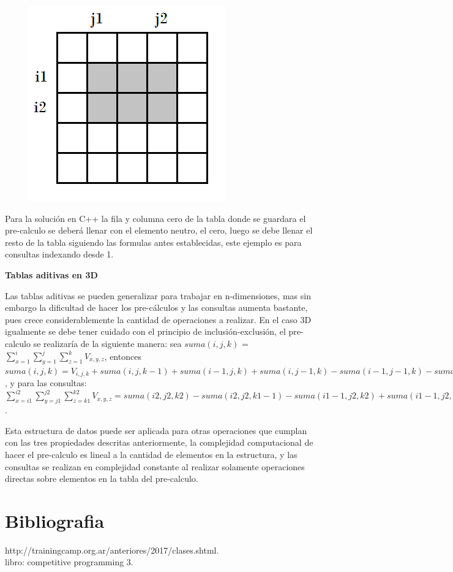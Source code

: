 \documentclass[12pt, a4paper]{article}
\newcommand\cppfile[2][]{

}
\newcommand{\subtitulo}[1]{\begin{center}\textbf{#1}\end{center}}
\begin{document}
\begin{figure}[!htb]
			\caption{}%
		\endminipage
			\centering
			\includegraphics[scale=0.4]{Estructuras_de_datos/imagenes/img4}
			\caption{}
		\endminipage
	\end{figure}
	
	Para la solución en C++ la fila y columna cero de la tabla donde se guardara el pre-calculo se deberá llenar
	con el elemento neutro, el cero, luego se debe llenar el resto de la tabla siguiendo las formulas antes 
	establecidas, este ejemplo es para consultas indexando desde 1.
	\cppfile[26-36]{Estructuras_de_datos/codigos/tablas_aditivas.cpp}
	
	\subtitulo{Tablas aditivas en 3D}
	
	Las tablas aditivas se pueden generalizar para trabajar en n-dimensiones, mas sin embargo la dificultad de hacer 
	los pre-cálculos y las consultas aumenta bastante, pues crece considerablemente la cantidad de operaciones a
	realizar. En el caso 3D igualmente se debe tener cuidado con el principio de inclusión-exclusión, el 
	pre-calculo se realizaría de la siguiente manera: sea 
	$suma(i,j,k)$ = $\sum_{x=1}^{i} \sum_{y=1}^{j} \sum_{z=1}^{k} V_{x,y,z}$, entonces  
	$suma(i,j,k) = V_{i,j,k} + suma(i,j,k-1)+suma(i-1,j,k)+suma(i,j-1,k)-suma(i-1,j-1,k)-suma(i-1,j,k-1)
	-suma(i,j-1,k-1)+suma(i-1,j-1,k-1)$, y para las consultas: $\sum_{x=i1}^{i2} \sum_{y=j1}^{j2} \sum_{z=k1}^{k2}
	V_{x,y,z} = suma(i2,j2,k2)-suma(i2,j2,k1-1)-suma(i1-1,j2,k2)+suma(i1-1,j2,k1-1)-suma(i2,j1-1,k2)
	+suma(i2,j1-1,k1-1)+suma(i1-1,j1-1,k2)-suma(i1-1,j1-1,k1-1)$.
	
	Esta estructura de datos puede ser aplicada para otras operaciones que cumplan con las tres propiedades descritas
	anteriormente, la complejidad computacional de hacer el pre-calculo es lineal a la cantidad de
	elementos en la estructura, y las consultas se realizan en complejidad constante al realizar solamente operaciones
	directas sobre elementos en la tabla del pre-calculo.
	
	\section{Bibliografia}
	
	http://trainingcamp.org.ar/anteriores/2017/clases.shtml.\\ 
	libro: competitive programming 3.\\ 

	
\end{document}
